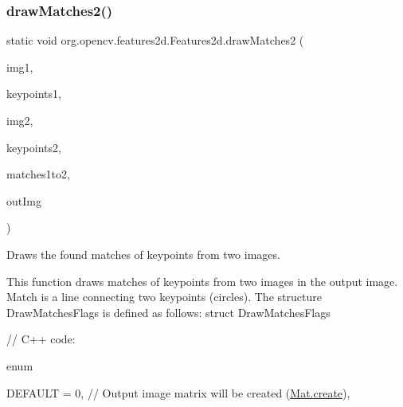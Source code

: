 \subsubsection{\texorpdfstring{draw\+Matches2()}{drawMatches2()}\hspace{0.1cm}{\footnotesize\ttfamily [2/2]}}
{\footnotesize\ttfamily static void org.\+opencv.\+features2d.\+Features2d.\+draw\+Matches2 (\begin{DoxyParamCaption}\item[{\mbox{\hyperlink{classorg_1_1opencv_1_1core_1_1_mat}{Mat}}}]{img1,  }\item[{\mbox{\hyperlink{classorg_1_1opencv_1_1core_1_1_mat_of_key_point}{Mat\+Of\+Key\+Point}}}]{keypoints1,  }\item[{\mbox{\hyperlink{classorg_1_1opencv_1_1core_1_1_mat}{Mat}}}]{img2,  }\item[{\mbox{\hyperlink{classorg_1_1opencv_1_1core_1_1_mat_of_key_point}{Mat\+Of\+Key\+Point}}}]{keypoints2,  }\item[{List$<$ \mbox{\hyperlink{classorg_1_1opencv_1_1core_1_1_mat_of_d_match}{Mat\+Of\+D\+Match}} $>$}]{matches1to2,  }\item[{\mbox{\hyperlink{classorg_1_1opencv_1_1core_1_1_mat}{Mat}}}]{out\+Img }\end{DoxyParamCaption})\hspace{0.3cm}{\ttfamily [static]}}

Draws the found matches of keypoints from two images.

This function draws matches of keypoints from two images in the output image. Match is a line connecting two keypoints (circles). The structure {\ttfamily Draw\+Matches\+Flags} is defined as follows\+: struct Draw\+Matches\+Flags {\ttfamily }

{\ttfamily }

{\ttfamily }

{\ttfamily // C++ code\+:}

{\ttfamily }

{\ttfamily }

{\ttfamily enum}

{\ttfamily }

{\ttfamily }

{\ttfamily D\+E\+F\+A\+U\+LT = 0, // Output image matrix will be created (\mbox{\hyperlink{classorg_1_1opencv_1_1core_1_1_mat_a539b0a3690afb6b43047b50cbb787fee}{Mat.\+create}}),}

{\ttfamily }

{\ttfamily }

